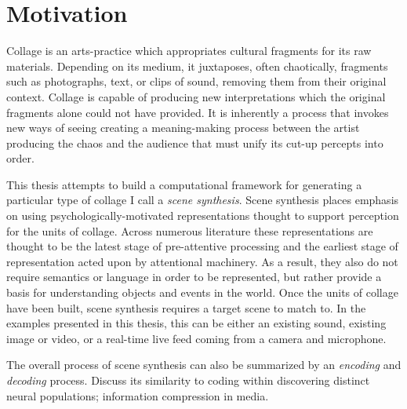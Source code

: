 \documentclass[a4paper,10pt,final]{ThesisStyle}
\begin{document}
\section{Motivation}



Collage is an arts-practice which appropriates cultural fragments for its raw materials.  Depending on its medium, it juxtaposes, often chaotically, fragments such as photographs, text, or clips of sound, removing them from their original context.  Collage is capable of producing new interpretations which the original fragments alone could not have provided.  It is inherently a process that invokes new ways of seeing creating a meaning-making process between the artist producing the chaos and the audience that must unify its cut-up percepts into order.  %


This thesis attempts to build a computational framework for generating a particular type of collage I call a \textit{scene synthesis}.  Scene synthesis places emphasis on using psychologically-motivated representations thought to support perception for the units of collage.  Across numerous literature these representations are thought to be the latest stage of pre-attentive processing and the earliest stage of representation acted upon by attentional machinery.  As a result, they also do not require semantics or language in order to be represented, but rather provide a basis for understanding objects and events in the world.  Once the units of collage have been built, scene synthesis requires a target scene to match to.  In the examples presented in this thesis, this can be either an existing sound, existing image or video, or a real-time live feed coming from a camera and microphone.   

The overall process of scene synthesis can also be summarized by an \textit{encoding} and \textit{decoding} process.  Discuss its similarity to coding within discovering distinct neural populations; information compression in media.
\end{document}
